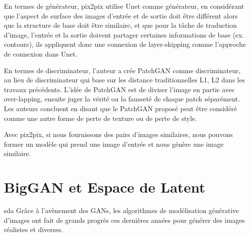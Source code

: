 En termes de générateur, pix2pix utilise Unet comme générateur, en considérant que l'aspect de surface des images d'entrée et de sortie doit être différent alors que la structure de base doit être similaire, et que pour la tâche de traduction d'image, l'entrée et la sortie doivent partager certaines informations de base (ex. contours), ils appliquent donc une connexion de layer-skipping comme l'approche de connexion dans Unet.

En termes de discriminateur, l'auteur a crée PatchGAN comme discriminateur, au lieu de  discriminateur qui base sur les distance traditionnelles L1, L2 dans les travaux précédents. L'idée de PatchGAN est de diviser l'image en partie avec over-lapping, ensuite juger la vérité ou la fausseté de chaque patch séparément. Les auteurs concluent en disant que le PatchGAN proposé peut être considéré comme une autre forme de perte de texture ou de perte de style.

Avec pix2pix, si nous fournissons des pairs d'images similaires, nous pouvons former un modèle qui prend une image d'entrée et nous génère une image similaire.


\section{BigGAN et Espace de Latent}

sda\cite{brock2018large}
Grâce à l'avènement des GANs, les algorithmes de modélisation générative d'images ont fait de grands progrès ces dernières années pour générer des images réalistes et diverses. 


